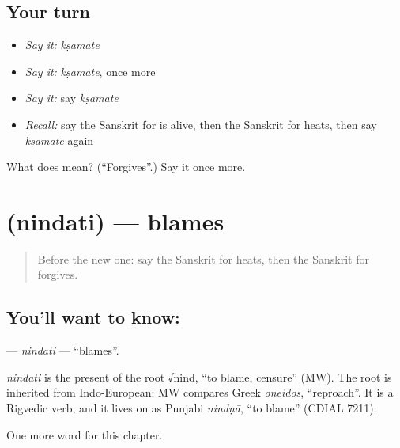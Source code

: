 \subsection*{Your turn}
\begin{itemize}
\raggedright
  \item \emph{Say it:} \emph{kṣamate}
  \item \emph{Say it:} \emph{kṣamate}, once more
  \item \emph{Say it:} say \emph{kṣamate}
  \item \emph{Recall:} say the Sanskrit for is alive, then the Sanskrit for heats, then say \emph{kṣamate} again
\end{itemize}

\begin{tcolorbox}[breakable,colback=teal!4,colframe=teal!35!black,title={Before you move on}]
What does  mean? (\textquotedblleft{}Forgives\textquotedblright{}.) Say it once more.
\end{tcolorbox}
\section[\texorpdfstring{\sk{निन्दति} (nindati)}{निन्दति (nindati)}]{ (nindati) — blames}

\label{lesson:SA-C205-nindati}



\begin{quote}
Before the new one: say the Sanskrit for heats, then the Sanskrit for forgives.
\end{quote}

\subsection*{You'll want to know: }
\textbf{} — \emph{nindati} — \textquotedblleft{}blames\textquotedblright{}.

\begin{cousinweb}
\emph{nindati} is the present of the root √nind, \textquotedblleft{}to blame, censure\textquotedblright{} (MW). The root is inherited from Indo-European: MW compares Greek \emph{oneidos}, \textquotedblleft{}reproach\textquotedblright{}. It is a Rigvedic verb, and it lives on as Punjabi \emph{nindṇā}, \textquotedblleft{}to blame\textquotedblright{} (CDIAL 7211).
\end{cousinweb}

\begin{grammarlens}[title={What you've built}]
One more word for this chapter.
\end{grammarlens}

